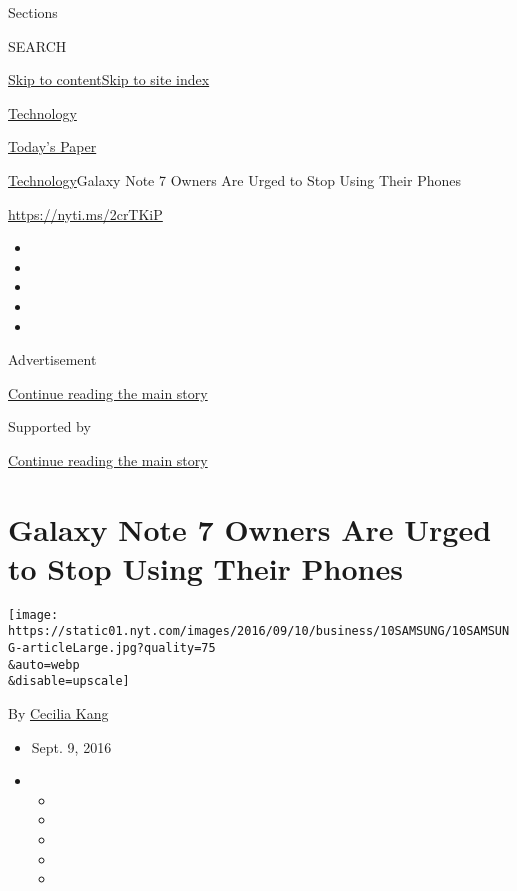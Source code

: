 Sections

SEARCH

\protect\hyperlink{site-content}{Skip to
content}\protect\hyperlink{site-index}{Skip to site index}

\href{https://www.nytimes.com/section/technology}{Technology}

\href{https://myaccount.nytimes.com/auth/login?response_type=cookie\&client_id=vi}{}

\href{https://www.nytimes.com/section/todayspaper}{Today's Paper}

\href{/section/technology}{Technology}\textbar{}Galaxy Note 7 Owners Are
Urged to Stop Using Their Phones

\url{https://nyti.ms/2crTKiP}

\begin{itemize}
\item
\item
\item
\item
\item
\end{itemize}

Advertisement

\protect\hyperlink{after-top}{Continue reading the main story}

Supported by

\protect\hyperlink{after-sponsor}{Continue reading the main story}

\hypertarget{galaxy-note-7-owners-are-urged-to-stop-using-their-phones}{%
\section{Galaxy Note 7 Owners Are Urged to Stop Using Their
Phones}\label{galaxy-note-7-owners-are-urged-to-stop-using-their-phones}}

\texttt{[image: https://static01.nyt.com/images/2016/09/10/business/10SAMSUNG/10SAMSUNG-articleLarge.jpg?quality=75\\\&auto=webp\\\&disable=upscale]}

By \href{http://www.nytimes.com/by/cecilia-kang}{Cecilia Kang}

\begin{itemize}
\item
  Sept. 9, 2016
\item
  \begin{itemize}
  \item
  \item
  \item
  \item
  \item
  \end{itemize}
\end{itemize}

